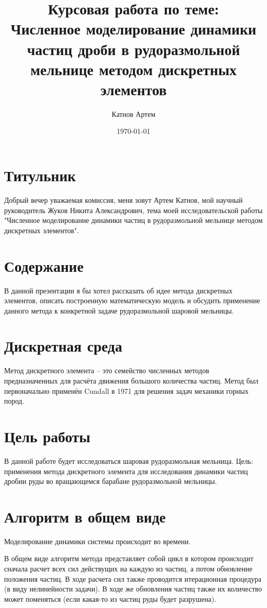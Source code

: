 \documentclass[a4paper]{article}
\author{Катнов Артем}
\title{Курсовая работа по теме: \\ Численное моделирование динамики частиц дроби в рудоразмольной мельнице методом дискретных элементов}
\date{\today}
\begin{document}
\section{Титульник}

Добрый вечер уважаемая комиссия, меня зовут Артем Катнов, мой научный руководитель Жуков Никита Александрович, тема моей исследовательской работы "Численное моделирование динамики частиц в рудоразмольной мельнице методом дискретных элементов".

\section{Содержание}

В данной презентации я бы хотел рассказать об идее метода дискретных элементов, описать построенную математическую модель и обсудить применение данного метода к конкретной задаче рудоразмольной шаровой мельницы.

\section{Дискретная среда}

Метод дискретного элемента -- это семейство численных методов предназначенных для расчёта движения большого количества частиц.
Метод был первоначально применён Cundall в 1971 для решения задач механики горных пород.

\section{Цель работы}

В данной работе будет исследоваться шаровая рудоразмольная мельница.
Цель: применения метода дискретного элемента для исследования динамики частиц дробии руды во вращающемся барабане рудоразмольной мельницы.

\section{Алгоритм в общем виде}

Моделирование динамики системы происходит во времени.

В общем виде алгоритм метода представляет собой цикл в котором происходит сначала расчет всех сил действущих на каждую из частиц, а потом обновление положения частиц.
В ходе расчета сил также проводится итерационная процедура (в виду нелинейности задачи).
В ходе же обновления частиц также их количество может поменяться (если какая-то из частиц руды будет разрушена).
\end{document}
